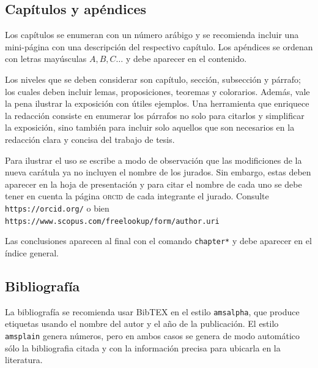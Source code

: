 \subsection{Cap\'itulos y ap\'endices}
Los cap\'itulos se enumeran con un n\'umero ar\'abigo y se recomienda incluir una mini-p\'agina con una descripci\'on del respectivo cap\'itulo.
Los ap\'endices se ordenan con letras may\'usculas $A, B, C \dots$ y debe aparecer en el contenido.
\par
Los niveles que se deben considerar son cap\'itulo, secci\'on, subsecci\'on y p\'arrafo; los cuales deben incluir lemas, proposiciones, teoremas y colorarios. Adem\'as, vale la pena ilustrar la exposici\'on  con \'utiles ejemplos.
Una herramienta que enriquece la redacci\'on consiste en enumerar los p\'arrafos no solo para citarlos y simplificar la exposici\'on, sino tambi\'en  para incluir solo aquellos que son necesarios en la redacci\'on clara y concisa del trabajo de tesis.
%
\begin{obs}
Para ilustrar el uso se escribe a modo de observación que las modificiones de la nueva carátula ya no incluyen el nombre de los jurados.
Sin embargo, estas deben aparecer en la hoja de presentación y para citar el nombre de cada uno se debe tener en cuenta la p\'agina \textsc{orcid} de cada integrante el jurado.
Consulte \texttt{https://orcid.org/} o bien \texttt{https://www.scopus.com/freelookup/form/author.uri}
\end{obs}
%
Las conclusiones aparecen al final con el comando \texttt{chapter*} y debe aparecer en el \'indice general.
\subsection{Bibliograf\'ia}%
La bibliograf\'ia se recomienda usar BibTEX en el estilo \texttt{amsalpha}, que produce etiquetas usando el nombre del autor y el a\~{n}o de la publicaci\'on.
El estilo \texttt{amsplain} genera números, pero en ambos casos se genera de modo automático sólo la bibliografia citada y con la información precisa para ubicarla en la literatura.
